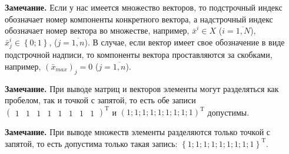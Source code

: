\textbf{Замечание.} Если у нас имеется множество векторов, то подстрочный индекс обозначает номер компоненты конкретного вектора, а надстрочный индекс обозначает номер вектора во множестве, например, $ \bar{x}^i \in X $ ($i=\overline{1,N}$), $ \bar{x}^i_j \in \left\lbrace 0; 1\right\rbrace  $, ($j=\overline{1,n}$). В случае, если вектор имеет свое обозначение в виде подстрочной надписи, то компоненты вектора проставляются за скобками, например, $ \left( \bar{x}_{max}\right)_j=0$ ($j=\overline{1,n}$). 

\textbf{Замечание.} При выводе матриц и векторов элементы могут разделяться как пробелом, так и точкой с запятой, то есть обе записи $ {\left(\begin{array}{cccccccc}
 1&1&1&1&1&1&1&1
\end{array} \right)}^\mathrm{T} $ и $ {\left(1;1;1;1;1;1;1;1;1 \right)}^\mathrm{T} $ допустимы.

\textbf{Замечание.} При выводе множеств элементы разделяются только точкой с запятой, то есть допустима только такая запись: $ {\left\lbrace 1;1;1;1;1;1;1;1;1 \right\rbrace }^\mathrm{T} $.

\singlespacing
\clearpage